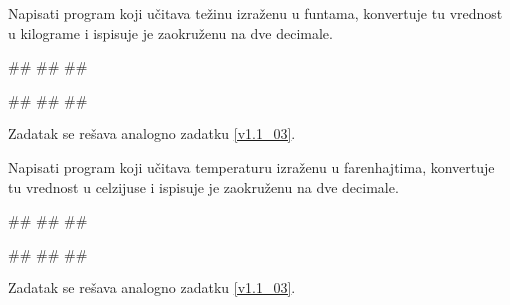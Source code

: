 \begin{Exercise}[label=p1.1_10b] 
Napisati program koji učitava težinu izraženu
   u funtama, konvertuje tu vrednost u kilograme i ispisuje je zaokruženu na dve decimale. 

\begin{miditest}
\begin{upotreba}{1}
#\naslovInt#
##
##
\end{upotreba}
\end{miditest}  
\begin{miditest}
\begin{upotreba}{2}
#\naslovInt#
##
##
\end{upotreba}
\end{miditest}   
\end{Exercise}
\begin{Answer}[ref=p1.1_10b]
Zadatak se rešava analogno zadatku \ref{v1.1_03}.
\end{Answer}


\begin{Exercise}[label=p1.1_10c] 
Napisati program koji učitava temperaturu izraženu
   u farenhajtima, konvertuje tu vrednost u celzijuse i ispisuje je zaokruženu na dve decimale. 
   
\begin{miditest}
\begin{upotreba}{1}
#\naslovInt#
##
##
\end{upotreba}
\end{miditest}  
\begin{miditest}
\begin{upotreba}{2}
#\naslovInt#
##
##
\end{upotreba}
\end{miditest}
\end{Exercise}
\begin{Answer}[ref=p1.1_10c]
Zadatak se rešava analogno zadatku \ref{v1.1_03}.
\end{Answer}






